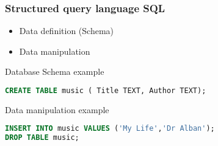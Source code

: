 \begin{frame}[fragile]
        \frametitle{Structured query language SQL}

\begin{itemize}
   \item Data definition (Schema)
   \item Data manipulation
\end{itemize}


Database Schema example
\begin{lstlisting}[language=sql]
CREATE TABLE music ( Title TEXT, Author TEXT);
\end{lstlisting}

Data manipulation example
\begin{lstlisting}[language=sql]
INSERT INTO music VALUES ('My Life','Dr Alban');
DROP TABLE music;
\end{lstlisting}

\end{frame}
